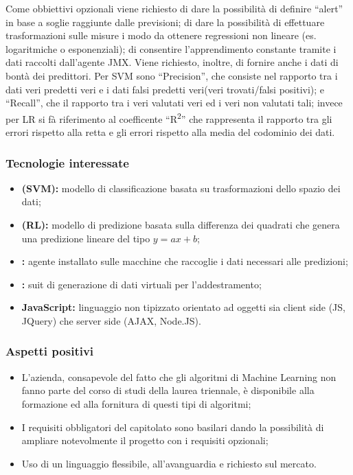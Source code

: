 			Come obbiettivi opzionali viene richiesto di dare la possibilità di definire ``alert'' in base a soglie raggiunte dalle previsioni; di dare la possibilità di effettuare trasformazioni sulle misure i modo da ottenere regressioni non lineare (es. logaritmiche o esponenziali); di consentire l'apprendimento constante tramite i dati raccolti dall'agente JMX. Viene richiesto, inoltre,  di fornire anche i dati di bontà dei predittori. Per SVM sono ``Precision'', che consiste nel rapporto tra i dati veri predetti veri e i dati falsi predetti veri(veri trovati/falsi positivi); e ``Recall'', che il rapporto tra i veri valutati veri ed i veri non valutati tali; invece per LR si fà riferimento al coefficente ``R\textsuperscript{2}'' che rappresenta il rapporto tra gli errori rispetto alla retta e gli errori rispetto alla media del codominio dei dati.


		\subsubsection{Tecnologie interessate}
			\begin{itemize}
			  \item \textbf{ (SVM):} modello di classificazione basata su trasformazioni dello spazio dei dati;
			  \item \textbf{ (RL):} modello di predizione basata sulla differenza dei quadrati che genera una predizione lineare del tipo \(y=ax+b\);
				\item \textbf{:} agente installato sulle macchine che raccoglie i dati necessari alle predizioni;
				\item \textbf{:} suit di generazione di dati virtuali per l'addestramento;
			  \item \textbf{JavaScript:} linguaggio non tipizzato orientato ad oggetti sia client side (JS, JQuery) che server side (AJAX, Node.JS).
			\end{itemize}

		\subsubsection{Aspetti positivi}
			\begin{itemize}
			  \item L’azienda, consapevole del fatto che gli algoritmi di Machine Learning non fanno parte del corso di studi della laurea triennale, è disponibile alla formazione ed alla fornitura di questi tipi di algoritmi;
			  \item I requisiti obbligatori del capitolato sono basilari dando la possibilità di ampliare notevolmente il progetto con i requisiti opzionali;
			  \item Uso di un linguaggio flessibile, all'avanguardia e richiesto sul mercato.
			\end{itemize}

